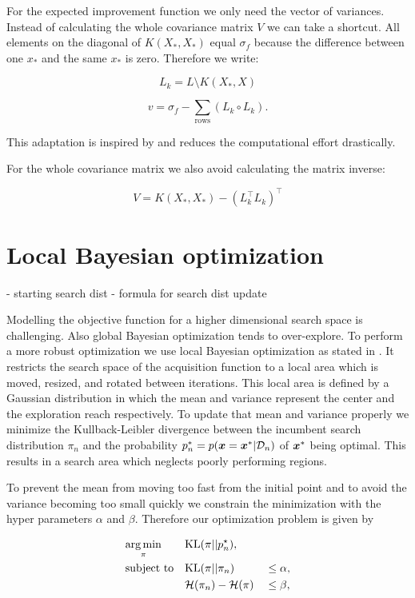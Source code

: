 For the expected improvement function we only need the vector of variances. Instead of calculating the whole covariance matrix $V$ we can take a shortcut. All elements on the diagonal of $K(X_*,X_*)$ equal $\sigma_f$ because the difference between one $x_*$ and the same $x_*$ is zero. Therefore we write:

$$L_k = L \setminus K(X_*,X)$$

$$v = \sigma_f - \sum_{\text{rows}} (L_k \circ L_k).$$

This adaptation is inspired by \cite{nandoCode} and reduces the computational effort drastically.

For the whole covariance matrix we also avoid calculating the matrix inverse:

$$V = K(X_*,X_*) - (L_k^\top L_k)^\top $$


\section{Local Bayesian optimization}

- starting search dist
- formula for search dist update

Modelling the objective function for a higher dimensional search space is challenging. Also global Bayesian optimization tends to over-explore. To perform a more robust optimization we use local Bayesian optimization as stated in \cite{akrour2017local}. It restricts the search space of the acquisition function to a local area which is moved, resized, and rotated between iterations. This local area is defined by a Gaussian distribution in which the mean and variance represent the center and the exploration reach respectively. To update that mean and variance properly we minimize the Kullback-Leibler divergence between the incumbent search distribution $\pi_n$ and the probability $p_n^* = p({\boldsymbol{x}}={\boldsymbol{x}}^*|\mathcal{D}_n)$ of ${\boldsymbol{x}}^*$ being optimal. This results in a search area which neglects poorly performing regions.

To prevent the mean from moving too fast from the initial point and to avoid the variance becoming too small quickly we constrain the minimization with the hyper parameters $\alpha$ and $\beta$. Therefore our optimization problem is given by

\begin{align}
    & \underset{\pi}{\arg\min} & & \mathrm{KL}(\pi||p_n^\star),& &\notag\\
    & \text{subject to}
    & & \mathrm{KL}(\pi||\pi_n) & &\leq \alpha,\label{eq:kl:our}\\
    & & &{\cal H}(\pi_n) - {\cal H}(\pi) & &\leq \beta,\label{eq:entropy:our}
\end{align}

